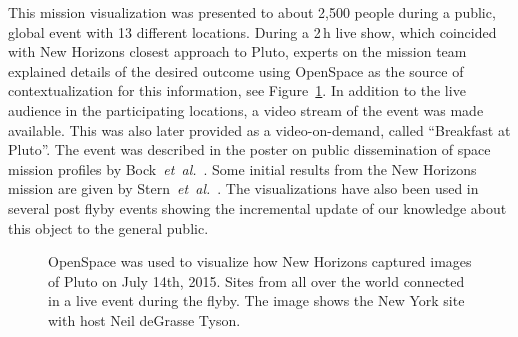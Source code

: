 \documentclass[journal]{vgtc}                %
\newcommand{\alexcomment}[1]{\textbf{[-Alex-~}
    \textcolor{magenta}{#1}
    \textbf{~]}}
\newcommand{\fig}[1]{Figure~\ref{fig:#1}}
\newcommand{\etal}{\emph{et~al.}}
\begin{document}
This mission visualization was presented to about 2,500 people during a public, global event with 13 different locations.
During a 2\,h live show, which coincided with New Horizons closest approach to Pluto, experts on the mission team explained details of the desired outcome using OpenSpace as the source of contextualization for this information, see \fig{nh_event}.
In addition to the live audience in the participating locations, a video stream of the event was made available. This was also later provided as a video-on-demand, called ``Breakfast at Pluto''.
The event was described in the poster on public dissemination of space mission profiles by Bock~\etal~\cite{Bock_2015}.
Some initial results from the New Horizons mission are given by Stern~\etal~\cite{stern2015pluto}.
The visualizations have also been used in several post flyby events showing the incremental update of our knowledge about this object to the general public.

\begin{figure}[b!]
\vspace*{-4mm}
    \centering
        \caption{OpenSpace was used to visualize how New Horizons captured images of Pluto on July 14th, 2015. Sites from all over the world connected in a live event during the flyby. The image shows the New York site with host Neil deGrasse Tyson.}%
    \label{fig:nh_event}
\end{figure}

\end{document}
